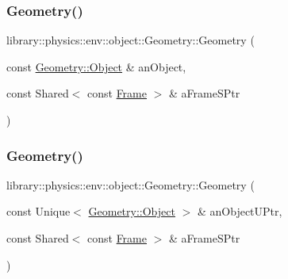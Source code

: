 \subsubsection{\texorpdfstring{Geometry()}{Geometry()}\hspace{0.1cm}{\footnotesize\ttfamily [1/3]}}
{\footnotesize\ttfamily library\+::physics\+::env\+::object\+::\+Geometry\+::\+Geometry (\begin{DoxyParamCaption}\item[{const \hyperlink{classlibrary_1_1physics_1_1env_1_1object_1_1_geometry_a4889a934df09768235fa2d89d0b0b0d6}{Geometry\+::\+Object} \&}]{an\+Object,  }\item[{const Shared$<$ const \hyperlink{classlibrary_1_1physics_1_1coord_1_1_frame}{Frame} $>$ \&}]{a\+Frame\+S\+Ptr }\end{DoxyParamCaption})}

\mbox{\label{classlibrary_1_1physics_1_1env_1_1object_1_1_geometry_af793dcd81d89096156cfbae25d39a12a}} 
\subsubsection{\texorpdfstring{Geometry()}{Geometry()}\hspace{0.1cm}{\footnotesize\ttfamily [2/3]}}
{\footnotesize\ttfamily library\+::physics\+::env\+::object\+::\+Geometry\+::\+Geometry (\begin{DoxyParamCaption}\item[{const Unique$<$ \hyperlink{classlibrary_1_1physics_1_1env_1_1object_1_1_geometry_a4889a934df09768235fa2d89d0b0b0d6}{Geometry\+::\+Object} $>$ \&}]{an\+Object\+U\+Ptr,  }\item[{const Shared$<$ const \hyperlink{classlibrary_1_1physics_1_1coord_1_1_frame}{Frame} $>$ \&}]{a\+Frame\+S\+Ptr }\end{DoxyParamCaption})}

\mbox{\label{classlibrary_1_1physics_1_1env_1_1object_1_1_geometry_ae686db5e0a555caf7636596a4b96495c}} 
